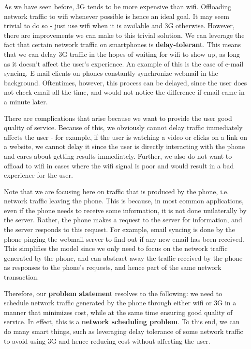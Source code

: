 \documentclass[12pt, fleqn]{article}
\begin{document}
As we have seen before, 3G tends to be more expensive than wifi. 
Offloading network traffic to wifi whenever possible is hence an ideal goal. It 
may seem trivial to do so - just use wifi when it is available and 3G otherwise.
However, there are improvements we can make to this trivial solution. 
We can leverage the fact that certain network traffic on 
smartphones is \textbf{delay-tolerant}. This means that we can delay 3G traffic in the 
hopes of waiting for wifi to show up, as long as it doesn't affect the user's 
experience. An example of this is 
the case of e-mail syncing. E-mail clients on phones constantly synchronize webmail in the 
background. Oftentimes, however, this process can be delayed, since the user does not 
check email all the time, and would not notice the difference if email came in a minute later.

There are complications that arise because we want to provide the user good 
quality of service. Because of this, we obviously cannot delay traffic 
immediately affects the user - for example, if the user is watching a video or clicks on a link on
a website, we cannot delay it since the user is directly interacting with the 
phone and cares about getting results immediately. Further, we also do not want 
to offload to wifi in cases where the wifi signal is poor and would result in a 
bad experience for the user.

Note that we are focusing here on traffic that is produced by the phone, i.e. 
network traffic leaving the phone. This is because, in most common applications, 
even if the phone needs to receive some information, it is not done unilaterally 
by the server. Rather, the phone makes a request to the server for information, 
and the server responds to this request. For example, email syncing is done by 
the phone pinging the webmail server to find out if any new email has been 
received. This simplifies the model since we only need to focus on the network
traffic generated by the phone, and can abstract away the traffic received by 
the phone as responses to the phone's requests, and hence part of the same 
network transaction.

Therefore, our \textbf{problem statement} resolves to the following: we need to 
schedule network traffic generated by the phone through either wifi or 3G in a 
manner that minimizes cost, while at the same time ensuring good quality of 
service. In effect, this is a \textbf{network scheduling problem}. 
To this end, we can do many smart things, such as leveraging delay 
tolerance of some network traffic to avoid using 3G and hence reducing cost 
without affecting the user.
 
\end{document}
